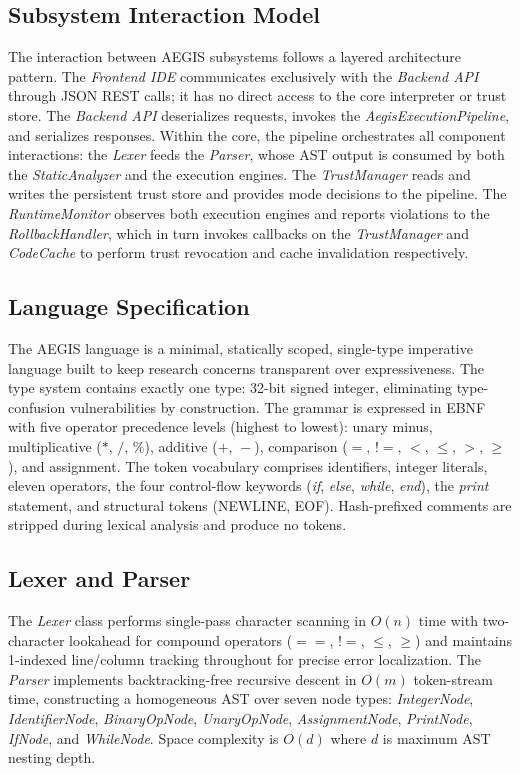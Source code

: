 \documentclass[conference]{IEEEtran}
\begin{document}
\subsection{Subsystem Interaction Model}

The interaction between AEGIS subsystems follows a layered
architecture pattern. The \textit{Frontend IDE} communicates
exclusively with the \textit{Backend API} through JSON REST
calls; it has no direct access to the core interpreter or trust
store. The \textit{Backend API} deserializes requests, invokes
the \textit{AegisExecutionPipeline}, and serializes responses.
Within the core, the pipeline orchestrates all component
interactions: the \textit{Lexer} feeds the \textit{Parser}, whose
AST output is consumed by both the \textit{StaticAnalyzer} and
the execution engines. The \textit{TrustManager} reads and writes
the persistent trust store and provides mode decisions to the
pipeline. The \textit{RuntimeMonitor} observes both execution
engines and reports violations to the \textit{RollbackHandler},
which in turn invokes callbacks on the \textit{TrustManager}
and \textit{CodeCache} to perform trust revocation and cache
invalidation respectively.

\subsection{Language Specification}

The AEGIS language is a minimal, statically scoped, single-type
imperative language built to keep research concerns transparent
over expressiveness. The type system contains exactly one type:
32-bit signed integer, eliminating type-confusion
vulnerabilities by construction. The grammar is expressed in EBNF
with five operator precedence levels (highest to lowest):
unary minus, multiplicative ($*,\,/,\,\%$), additive ($+,\,-$),
comparison ($\!=\!,\,!=\!,\,<,\,\leq,\,>,\,\geq$), and assignment.
The token vocabulary comprises identifiers, integer literals, eleven
operators, the four control-flow keywords (\textit{if},
\textit{else}, \textit{while}, \textit{end}), the \textit{print}
statement, and structural tokens (NEWLINE, EOF).
Hash-prefixed comments are stripped during lexical analysis and
produce no tokens.

\subsection{Lexer and Parser}

The \textit{Lexer} class performs single-pass character scanning in
$O(n)$ time with two-character lookahead for compound operators
($=\!=$, $!=$, $\leq$, $\geq$) and maintains 1-indexed
line/column tracking throughout for precise error localization.
The \textit{Parser} implements backtracking-free recursive descent
in $O(m)$ token-stream time, constructing a homogeneous AST over
seven node types: \textit{IntegerNode}, \textit{IdentifierNode},
\textit{BinaryOpNode}, \textit{UnaryOpNode},
\textit{AssignmentNode}, \textit{PrintNode}, \textit{IfNode}, and
\textit{WhileNode}. Space complexity is $O(d)$ where $d$ is maximum
AST nesting depth.
\end{document}
